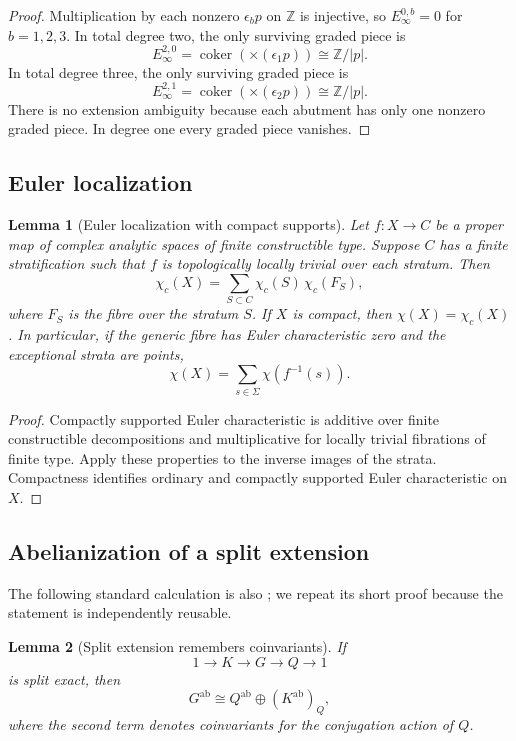 \documentclass[11pt,reqno]{amsart}
\numberwithin{equation}{section}
\newcommand{\Z}{\mathbb Z}
\newcommand{\coker}{\operatorname{coker}}
\newcommand{\chic}{\chi_c}
\newtheorem{lemma}[lemma]{Lemma}
\theoremstyle{definition}
\begin{document}
\begin{proof}
Multiplication by each nonzero $\epsilon_b p$ on $\Z$ is injective, so $E_\infty^{0,b}=0$ for $b=1,2,3$. In total degree two, the only surviving graded piece is
\[
E_\infty^{2,0}=\coker(\times(\epsilon_1p))\cong\Z/|p|.
\]
In total degree three, the only surviving graded piece is
\[
E_\infty^{2,1}=\coker(\times(\epsilon_2p))\cong\Z/|p|.
\]
There is no extension ambiguity because each abutment has only one nonzero graded piece. In degree one every graded piece vanishes.
\end{proof}

\subsection{Euler localization}

\begin{lemma}[Euler localization with compact supports]\label{lem:euler-localization}
Let $f:X\to C$ be a proper map of complex analytic spaces of finite constructible type. Suppose $C$ has a finite stratification such that $f$ is topologically locally trivial over each stratum. Then
\[
\chic(X)=\sum_{S\subset C}\chic(S)\,\chic(F_S),
\]
where $F_S$ is the fibre over the stratum $S$. If $X$ is compact, then $\chi(X)=\chic(X)$. In particular, if the generic fibre has Euler characteristic zero and the exceptional strata are points,
\[
\chi(X)=\sum_{s\in\Sigma}\chi(f^{-1}(s)).
\]
\end{lemma}

\begin{proof}
Compactly supported Euler characteristic is additive over finite constructible decompositions and multiplicative for locally trivial fibrations of finite type. Apply these properties to the inverse images of the strata. Compactness identifies ordinary and compactly supported Euler characteristic on $X$.
\end{proof}

\subsection{Abelianization of a split extension}

The following standard calculation is also \cite[Lem.~10.7]{S6}; we repeat its short proof because the statement is independently reusable.

\begin{lemma}[Split extension remembers coinvariants]\label{lem:split-extension}
If
\[
1\longrightarrow K\longrightarrow G\longrightarrow Q\longrightarrow1
\]
is split exact, then
\[
G^{\mathrm{ab}}\cong Q^{\mathrm{ab}}\oplus(K^{\mathrm{ab}})_Q,
\]
where the second term denotes coinvariants for the conjugation action of $Q$.
\end{lemma}
\end{document}
